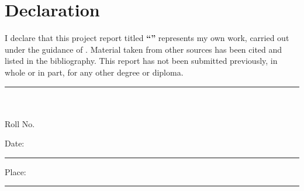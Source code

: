 \chapter*{Declaration}

I declare that this project report titled \textbf{``\projecttitle''} represents
my own work, carried out under the guidance of \guidename. Material taken from
other sources has been cited and listed in the bibliography. This report has
not been submitted previously, in whole or in part, for any other degree or
diploma.

\vspace{3.0cm}

\noindent
\begin{flushright}
\begin{minipage}{0.45\textwidth}
\centering
\rule{5cm}{0.4pt}\\
\studentname\\
Roll No.\ \studentroll
\end{minipage}
\end{flushright}

\vspace{1.5cm}

\noindent Date: \rule{4cm}{0.4pt} \hfill Place: \rule{4cm}{0.4pt}

\clearpage

